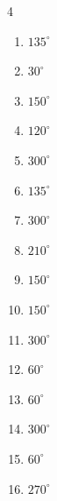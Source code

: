 \begin{multicols}{4}
\begin{enumerate}
  \item $\displaystyle 135^{\circ}$

  \item $\displaystyle 30^{\circ}$

  \item $\displaystyle 150^{\circ}$

  \item $\displaystyle 120^{\circ}$

  \item $\displaystyle 300^{\circ}$

  \item $\displaystyle 135^{\circ}$

  \item $\displaystyle 300^{\circ}$

  \item $\displaystyle 210^{\circ}$

  \item $\displaystyle 150^{\circ}$

\columnbreak %

  \item $\displaystyle 150^{\circ}$

  \item $\displaystyle 300^{\circ}$

  \item $\displaystyle 60^{\circ}$

  \item $\displaystyle 60^{\circ}$

  \item $\displaystyle 300^{\circ}$

  \item $\displaystyle 60^{\circ}$

  \item $\displaystyle 270^{\circ}$


\end{enumerate}
\end{multicols}
